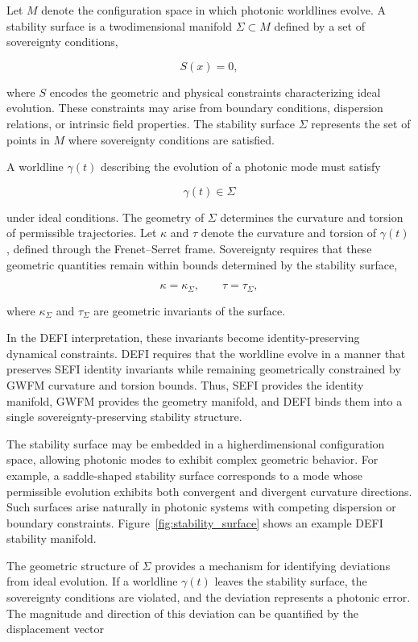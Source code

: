 \documentclass[aip,adv,reprint,floatfix]{revtex4-2}
\begin{document}
Let $M$ denote the configuration space in which photonic worldlines evolve. A stability surface is a twodimensional manifold $\Sigma \subset M$ defined by a set of
sovereignty conditions,


\[
S(x) = 0,
\]


where $S$ encodes the geometric and physical constraints
characterizing ideal evolution.\cite{DuttonElectronField2026} These constraints may
arise from boundary conditions, dispersion relations, or
intrinsic field properties. The stability surface $\Sigma$ represents the set of points in $M$ where sovereignty conditions
are satisfied.

A worldline $\gamma(t)$ describing the evolution of a photonic
mode must satisfy


\[
\gamma(t) \in \Sigma
\]


under ideal conditions. The geometry of $\Sigma$ determines
the curvature and torsion of permissible trajectories. Let
$\kappa$ and $\tau$ denote the curvature and torsion of $\gamma(t)$, defined
through the Frenet–Serret frame.\cite{DuttonElectronField2026} Sovereignty requires
that these geometric quantities remain within bounds determined by the stability surface,


\[
\kappa = \kappa_{\Sigma}, \qquad \tau = \tau_{\Sigma},
\]


where $\kappa_{\Sigma}$ and $\tau_{\Sigma}$ are geometric invariants of the surface.

In the DEFI interpretation, these invariants become
identity-preserving dynamical constraints.\cite{DuttonSEFI2026}
DEFI requires that the worldline evolve in a manner that preserves SEFI identity invariants while remaining geometrically constrained by GWFM curvature and torsion
bounds. Thus, SEFI provides the identity manifold,
GWFM provides the geometry manifold, and DEFI binds
them into a single sovereignty-preserving stability structure.

The stability surface may be embedded in a higherdimensional configuration space, allowing photonic
modes to exhibit complex geometric behavior.\cite{DuttonElectronField2026}
For example, a saddle-shaped stability surface corresponds to a
mode whose permissible evolution exhibits both convergent and divergent curvature directions. Such surfaces
arise naturally in photonic systems with competing dispersion or boundary constraints. Figure~\ref{fig:stability_surface}
shows an example DEFI stability manifold.

The geometric structure of $\Sigma$ provides a mechanism for
identifying deviations from ideal evolution. If a worldline
$\gamma(t)$ leaves the stability surface, the sovereignty conditions are violated, and the deviation represents a photonic error. The magnitude and direction of this deviation can be quantified by the displacement vector
\end{document}
